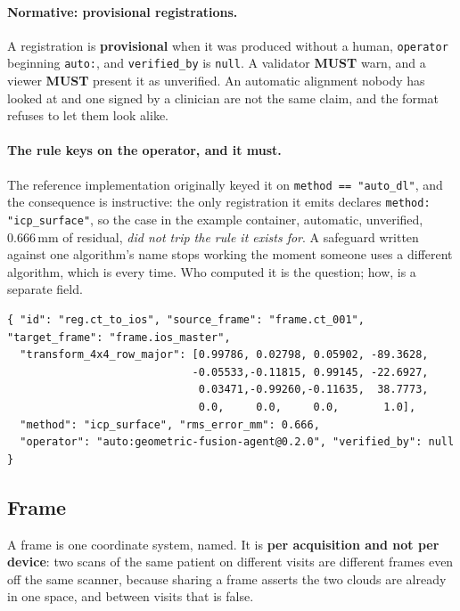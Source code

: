 \documentclass[11pt,a4paper]{article}
\newcommand{\MUST}{\textcolor{uosred}{\textbf{MUST}}}
\newcommand{\code}[1]{\texttt{\small #1}}
\begin{document}
\paragraph{Normative: provisional registrations.} A registration is \textbf{provisional}
when it was produced without a human, \code{operator} beginning \code{auto:}, and
\code{verified\_by} is \code{null}. A validator \MUST{} warn, and a viewer \MUST{} present
it as unverified. An automatic alignment nobody has looked at and one signed by a clinician
are not the same claim, and the format refuses to let them look alike.

\paragraph{The rule keys on the operator, and it must.} The reference implementation
originally keyed it on \code{method == "auto\_dl"}, and the consequence is instructive: the
only registration it emits declares \code{method: "icp\_surface"}, so the case in the
example container, automatic, unverified, 0.666\,mm of residual, \emph{did not trip
the rule it exists for}. A safeguard written against one algorithm's name stops working the
moment someone uses a different algorithm, which is every time. Who computed it is the
question; how, is a separate field.

\begin{lstlisting}[style=js]
{ "id": "reg.ct_to_ios", "source_frame": "frame.ct_001", "target_frame": "frame.ios_master",
  "transform_4x4_row_major": [0.99786, 0.02798, 0.05902, -89.3628,
                             -0.05533,-0.11815, 0.99145, -22.6927,
                              0.03471,-0.99260,-0.11635,  38.7773,
                              0.0,     0.0,     0.0,       1.0],
  "method": "icp_surface", "rms_error_mm": 0.666,
  "operator": "auto:geometric-fusion-agent@0.2.0", "verified_by": null }
\end{lstlisting}

\subsection{Frame}

A frame is one coordinate system, named. It is \textbf{per acquisition and not per device}: two scans of the same patient on different visits are different frames even off the same scanner, because sharing a frame asserts the two clouds are already in one space, and between visits that is false.
\end{document}

